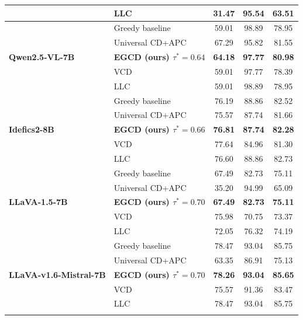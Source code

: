 \documentclass[pdflatex,sn-basic,Numbered]{sn-jnl}
\theoremstyle{thmstyleone}
\theoremstyle{thmstyletwo}
\theoremstyle{thmstylethree}
\begin{document}
\begin{center}
\begin{minipage}{\textwidth}
\begin{threeparttable}
\begin{tabular}{@{}llccc@{}}
 & LLC                        & 31.47 & 95.54 & 63.51 \\
\midrule
\multirow{5}{*}{\textbf{Qwen2.5-VL-7B}}
 & Greedy baseline            & 59.01 & 98.89 & 78.95 \\
 & Universal CD+APC           & 67.29 & 95.82 & 81.55 \\
 & \textbf{EGCD (ours) $\tau^{*} = 0.64$} & \textbf{64.18} & \textbf{97.77} & \textbf{80.98} \\
 & VCD                        & 59.01 & 97.77 & 78.39 \\
 & LLC                        & 59.01 & 98.89 & 78.95 \\
\midrule
\multirow{5}{*}{\textbf{Idefics2-8B}}
 & Greedy baseline            & 76.19 & 88.86 & 82.52 \\
 & Universal CD+APC           & 75.57 & 87.74 & 81.66 \\
 & \textbf{EGCD (ours) $\tau^{*} = 0.66$} & \textbf{76.81} & \textbf{87.74} & \textbf{82.28} \\
 & VCD                        & 77.64 & 84.96 & 81.30 \\
 & LLC                        & 76.60 & 88.86 & 82.73 \\
\midrule
\multirow{5}{*}{\textbf{LLaVA-1.5-7B}}
 & Greedy baseline            & 67.49 & 82.73 & 75.11 \\
 & Universal CD+APC           & 35.20 & 94.99 & 65.09 \\
 & \textbf{EGCD (ours) $\tau^{*} = 0.70$} & \textbf{67.49} & \textbf{82.73} & \textbf{75.11} \\
 & VCD                        & 75.98 & 70.75 & 73.37 \\
 & LLC                        & 72.05 & 76.32 & 74.19 \\
\midrule
\multirow{5}{*}{\textbf{LLaVA-v1.6-Mistral-7B}}
 & Greedy baseline            & 78.47 & 93.04 & 85.75 \\
 & Universal CD+APC           & 63.35 & 86.91 & 75.13 \\
 & \textbf{EGCD (ours) $\tau^{*} = 0.70$} & \textbf{78.26} & \textbf{93.04} & \textbf{85.65} \\
 & VCD                        & 75.57 & 91.36 & 83.47 \\
 & LLC                        & 78.47 & 93.04 & 85.75 \\
\botrule
\end{tabular}
\end{threeparttable}
\end{minipage}
\end{center}
\end{document}
